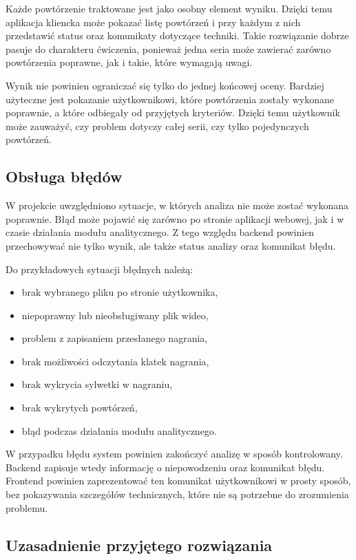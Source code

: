 Każde powtórzenie traktowane jest jako osobny element wyniku. Dzięki temu aplikacja kliencka może pokazać listę powtórzeń i przy każdym z nich przedstawić status oraz komunikaty dotyczące techniki. Takie rozwiązanie dobrze pasuje do charakteru ćwiczenia, ponieważ jedna seria może zawierać zarówno powtórzenia poprawne, jak i takie, które wymagają uwagi.

Wynik nie powinien ograniczać się tylko do jednej końcowej oceny. Bardziej użyteczne jest pokazanie użytkownikowi, które powtórzenia zostały wykonane poprawnie, a które odbiegały od przyjętych kryteriów. Dzięki temu użytkownik może zauważyć, czy problem dotyczy całej serii, czy tylko pojedynczych powtórzeń.

\subsection{Obsługa błędów}

W projekcie uwzględniono sytuacje, w których analiza nie może zostać wykonana poprawnie. Błąd może pojawić się zarówno po stronie aplikacji webowej, jak i w czasie działania modułu analitycznego. Z tego względu backend powinien przechowywać nie tylko wynik, ale także status analizy oraz komunikat błędu.

Do przykładowych sytuacji błędnych należą:

\begin{itemize}
\item brak wybranego pliku po stronie użytkownika,
\item niepoprawny lub nieobsługiwany plik wideo,
\item problem z zapisaniem przesłanego nagrania,
\item brak możliwości odczytania klatek nagrania,
\item brak wykrycia sylwetki w nagraniu,
\item brak wykrytych powtórzeń,
\item błąd podczas działania modułu analitycznego.
\end{itemize}

W przypadku błędu system powinien zakończyć analizę w sposób kontrolowany. Backend zapisuje wtedy informację o niepowodzeniu oraz komunikat błędu. Frontend powinien zaprezentować ten komunikat użytkownikowi w prosty sposób, bez pokazywania szczegółów technicznych, które nie są potrzebne do zrozumienia problemu.

\subsection{Uzasadnienie przyjętego rozwiązania}

